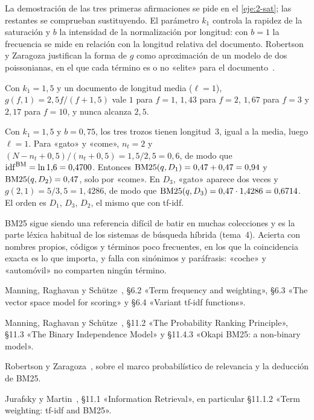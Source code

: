 La demostración de las tres primeras afirmaciones se pide en el \cref{eje:2-sat}; las restantes se comprueban sustituyendo. El parámetro $k_1$ controla la rapidez de la saturación y $b$ la intensidad de la normalización por longitud: con $b=1$ la frecuencia se mide en relación con la longitud relativa del documento. Robertson y Zaragoza justifican la forma de $g$ como aproximación de un modelo de dos poissonianas, en el que cada término es o no «elite» para el documento~\cite{rz}.

\begin{ejemplo}[Saturación]\label{ej:saturacion}
Con $k_1=1{,}5$ y un documento de longitud media ($\ell=1$), $g(f,1)=2{,}5f/(f+1{,}5)$ vale $1$ para $f=1$, $1{,}43$ para $f=2$, $1{,}67$ para $f=3$ y $2{,}17$ para $f=10$, y nunca alcanza $2{,}5$.
\end{ejemplo}

\begin{ejemplo}\label{ej:bm25}
Con $k_1=1{,}5$ y $b=0{,}75$, los tres trozos tienen longitud~3, igual a la media, luego $\ell=1$. Para «gato» y «come», $n_t=2$ y $(N-n_t+0{,}5)/(n_t+0{,}5)=1{,}5/2{,}5=0{,}6$, de modo que $\operatorname{idf}^{\mathrm{BM}}=\ln 1{,}6=0{,}4700$. Entonces $\operatorname{BM25}(q,D_1)=0{,}47+0{,}47=0{,}94$ y $\operatorname{BM25}(q,D_2)=0{,}47$, solo por «come». En $D_3$, «gato» aparece dos veces y $g(2,1)=5/3{,}5=1{,}4286$, de modo que $\operatorname{BM25}(q,D_3)=0{,}47\cdot 1{,}4286=0{,}6714$. El orden es $D_1$, $D_3$, $D_2$, el mismo que con tf-idf.
\end{ejemplo}

\begin{observacion}
BM25 sigue siendo una referencia difícil de batir en muchas colecciones y es la parte léxica habitual de los sistemas de búsqueda híbrida (tema~4). Acierta con nombres propios, códigos y términos poco frecuentes, en los que la coincidencia exacta es lo que importa, y falla con sinónimos y paráfrasis: «coche» y «automóvil» no comparten ningún término.
\end{observacion}

\begin{lecturas}
\item Manning, Raghavan y Schütze~\cite{iir}, §6.2 «Term frequency and weighting», §6.3 «The vector space model for scoring» y §6.4 «Variant tf-idf functions».
\item Manning, Raghavan y Schütze~\cite{iir}, §11.2 «The Probability Ranking Principle», §11.3 «The Binary Independence Model» y §11.4.3 «Okapi BM25: a non-binary model».
\item Robertson y Zaragoza~\cite{rz}, sobre el marco probabilístico de relevancia y la deducción de BM25.
\item Jurafsky y Martin~\cite{jm3}, §11.1 «Information Retrieval», en particular §11.1.2 «Term weighting: tf-idf and BM25».
\end{lecturas}

